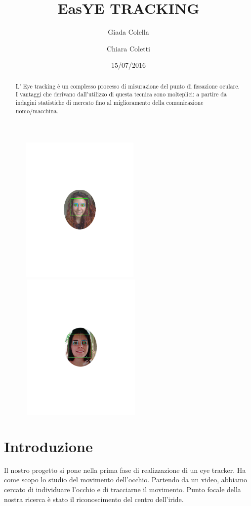 \documentclass[12pt]{article}
\title{\textbf{EasYE TRACKING}}
\author{Giada Colella \and Chiara Coletti}
\date{15/07/2016}
\begin{document}
	

\begin{figure}
\centering
\includegraphics[width=6cm,height=7.2cm]{im2}%
\qquad\qquad
\includegraphics[width=6.1cm,height=7.25cm]{im}
\end{figure}

\maketitle
\pagebreak

\tableofcontents

\pagebreak

\begin{abstract}
	L' Eye tracking è un complesso processo di misurazione del punto di fissazione oculare. I vantaggi che derivano dall'utilizzo di questa tecnica sono molteplici: a partire da indagini statistiche di mercato fino al miglioramento della comunicazione uomo/macchina.
\end{abstract}
\pagebreak
\section{Introduzione}
Il nostro progetto si pone nella prima fase di realizzazione di un eye tracker. Ha come scopo lo studio del movimento dell'occhio. Partendo da un video, abbiamo cercato di individuare l'occhio e di tracciarne il movimento. Punto focale della nostra ricerca è stato il riconoscimento del centro dell'iride. 
\end{document}
